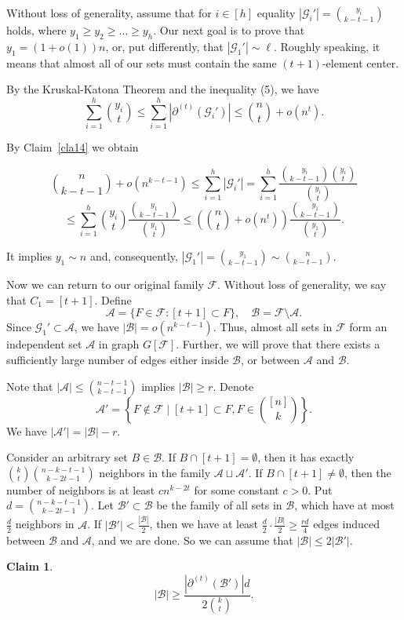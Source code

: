 \documentclass[12pt,a4paper]{article}
\newcommand{\ff}{\mathcal{F}}
\newcommand{\cG}{\mathcal{G}}
\newcommand{\cA}{\mathcal{A}}
\newcommand{\bb}{\mathcal{B}}
\newtheorem{Claim}[Theorem]{Claim}
\begin{document}
Without loss of generality, assume that for $i \in [h]$ equality $|\cG_i'|=\binom{y_i}{k-t-1}$ holds, where $y_1 \geqslant y_2 \geqslant \ldots \geqslant y_h$. Our next goal is to prove that $y_1 = (1+o(1))n$, or, put differently, that $|\cG_1'| \sim \ell.$ Roughly speaking, it means that almost all of our sets must contain the same $(t+1)$-element center.

By the Kruskal-Katona Theorem and the inequality (5), we have $$ \sum_{i=1}^h \binom{y_i}{t} \leqslant  \sum_{i=1}^h |\partial^{(t)}(\cG_i')| \leqslant \binom{n}{t} + o(n^t).$$
 
By Claim~\ref{cla14} we obtain

$$\binom{n}{k-t-1} + o(n^{k-t-1}) \leqslant \sum_{i=1}^h |\cG_i'| =\sum_{i=1}^h \frac{\binom{y_i}{k-t-1}\binom{y_i}{t}}{\binom{y_i}{t}} $$ 
$$\leqslant \sum_{i=1}^h \binom{y_i}{t} \frac{\binom{y_1}{k-t-1}}{\binom{y_1}{t}} \leqslant 
\left(\binom{n}{t} + o(n^t)\right) \frac{\binom{y_1}{k-t-1}}{\binom{y_1}{t}}.$$

It implies $y_1 \sim n$ and, consequently, $|\cG_1'| = \binom{y_1}{k-t-1} \sim \binom{n}{k-t-1}$. 

Now we can return to our original family $\ff$. Without loss of generality, we say that $C_1=[t+1].$ Define
$$\cA = \{F \in \ff : [t+1] \subset F \}, \quad \bb = \ff \setminus \cA.$$
Since $\cG_1' \subset \cA$, we have $|\bb| = o(n^{k-t-1})$. Thus, almost all sets in $\ff$ form an independent set $\cA$ in graph $G[\ff]$. Further, we will prove that there exists a sufficiently large number of edges either inside $\bb$, or between $\cA$ and $\bb$.

Note that $|\cA| \leqslant \binom{n-t-1}{k-t-1}$ implies $|\bb| \geqslant r.$ Denote
$$\cA' = \left\{F \notin \ff \mid [t+1] \subset F, F \in \binom{[n]}{k} \right\}.$$
We have $|\cA'| = |\bb| -r.$

Consider an arbitrary set $B \in \bb$. If $B \cap [t+1] = \emptyset$, then it has exactly $\binom{k}{t}\binom{n-k-t-1}{k-2t-1}$ neighbors in the family $\cA \sqcup \cA'$. If $B \cap [t+1] \neq \emptyset$, then the number of neighbors is at least $cn^{k-2t}$ for some constant $c>0$. Put $d=\binom{n-k-t-1}{k-2t-1}.$ Let $\bb'\subset \bb$ be the family of all sets in $\bb$, which have at most $\frac{d}{2}$ neighbors in $\cA$. If $|\bb'| < \frac{|\bb|}{2}$, then we have at least $\frac{d}{2} \cdot \frac{|B|}{2} \geqslant \frac{rd}{4}$ edges induced between $\bb$ and $\cA$, and we are done. So we can assume that $|\bb| \leqslant 2|\bb'|$.

\begin{Claim}\label{cla16}
    $$|\bb| \geqslant \frac{|\partial^{(t)}(\mathcal{B'})|d}{2\binom{k}{t}}.$$
\end{Claim}
\end{document}
